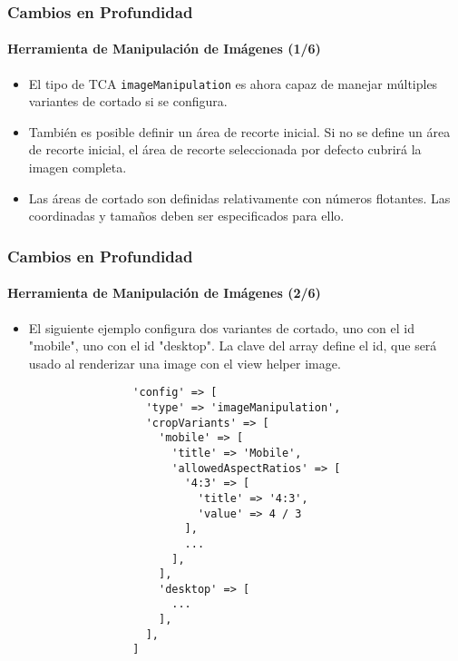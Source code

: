 \begin{frame}[fragile]
	\frametitle{Cambios en Profundidad}
	\framesubtitle{Herramienta de Manipulación de Imágenes (1/6)}

	\lstset{basicstyle=\tiny\ttfamily}

	\begin{itemize}
		\item El tipo de TCA \texttt{imageManipulation} es ahora capaz de manejar múltiples variantes de cortado si se configura.

		\item También es posible definir un área de recorte inicial. Si no se define un área de recorte inicial,
			el área de recorte seleccionada por defecto cubrirá la imagen completa.
		\item Las áreas de cortado son definidas relativamente con números flotantes. Las coordinadas y
			tamaños deben ser especificados para ello.

	\end{itemize}

\end{frame}


\begin{frame}[fragile]
	\frametitle{Cambios en Profundidad}
	\framesubtitle{Herramienta de Manipulación de Imágenes (2/6)}

	\lstset{basicstyle=\tiny\ttfamily}

	\begin{itemize}

		\item El siguiente ejemplo configura dos variantes de cortado,
			uno con el id "mobile", uno con el id "desktop".
			La clave del array define el id, que será usado al
			renderizar una image con el view helper image.

			\begin{lstlisting}
				'config' => [
				  'type' => 'imageManipulation',
				  'cropVariants' => [
				    'mobile' => [
				      'title' => 'Mobile',
				      'allowedAspectRatios' => [
				        '4:3' => [
				          'title' => '4:3',
				          'value' => 4 / 3
				        ],
				        ...
				      ],
				    ],
				    'desktop' => [
				      ...
				    ],
				  ],
				]
			\end{lstlisting}

	\end{itemize}

\end{frame}

